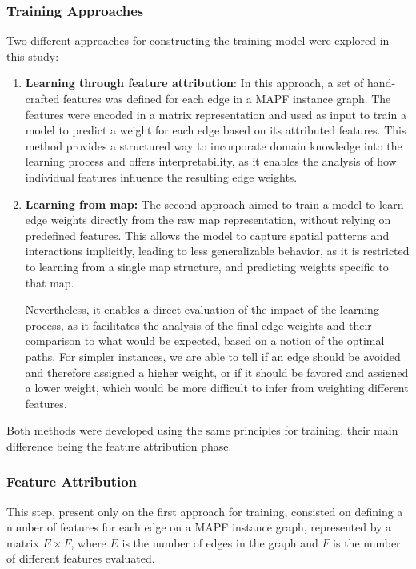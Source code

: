\subsubsection{Training Approaches}
Two different approaches for constructing the training model were explored in this study:
\begin{enumerate}
    \item \textbf{Learning through feature attribution}:  In this approach, a set of hand-crafted features was defined for each edge in a MAPF instance graph. The features were encoded in a matrix representation and used as input to train a model to predict a weight for each edge based on its attributed features. This method provides a structured way to incorporate domain knowledge into the learning process and offers interpretability, as it enables the analysis of how individual features influence the resulting edge weights.
    \item \textbf{Learning from map: } The second approach aimed to train a model to learn edge weights directly from the raw map representation, without relying on predefined features. This allows the model to capture spatial patterns and interactions implicitly, leading to less generalizable behavior, as it is restricted to learning from a single map structure, and predicting weights specific to that map. 
    
    Nevertheless, it enables a direct evaluation of the impact of the learning process, as it facilitates the analysis of the final edge weights and their comparison to what would be expected, based on a notion of the optimal paths. For simpler instances, we are able to tell if an edge should be avoided and therefore assigned a higher weight, or if it should be favored and assigned a lower weight, which would be more difficult to infer from weighting different features.    
\end{enumerate}
Both methods were developed using the same principles for training, their main difference being the feature attribution phase.

\subsubsection{Feature Attribution}
This step, present only on the first approach for training, consisted on defining a number of features for each edge on a MAPF instance graph, represented by a matrix $E \times F$, where $E$ is the number of edges in the graph and $F$ is the number of different features evaluated. 

